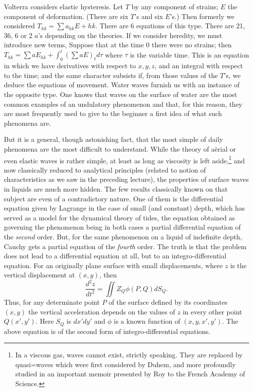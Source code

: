 \documentclass[12pt,oneside]{book}
\newcommand{\iit}[1]{\textit{#1}}
\begin{document}
Volterra considers elastic hysteresis. Let $T$ by any component of strains; $E$
the component of deformation. (There are six $T$'s and six $E$'s.) Then formerly
we considered $T_{hk}=\sum a_{hk}E+{hk}$. There are 6 equations of this type.
There are 21, 36, 6 or 2 $a$'s depending on the theories. If we consider
heredity, we must introduce new terms, Suppose that at the time 0 there were no
strains; then $T_{hk}=\sum aE_{hk}+\int_0^t(\sum aE)_td\tau$ where $\tau$ is the
variable time. This is an equation in which we have derivatives with respect to
$x,y,z$, and an integral with respect to the time; and the same character
subsists if, from those values of the $T$'s, we deduce the equations of
movement. Water waves furnish us with an instance of the opposite type. One
knows that waves on the surface of water are the most common examples of an
undulatory phenomenon and that, for this reason, they are most frequently used
to give to the beginner a first idea of what such phenomena are. \par

But it is a general, though astonishing fact, that the most simple of daily
phenomena are the most difficult to understand. While the theory of a\"erial or
even elastic waves is rather simple, at least as long as viscosity is left
aside,\footnote{In a viscous gas, waves cannot exist, strictly speaking. They
are replaced by quasi=waves which were first considered by Duhem, and more
profoundly studied in an important memoir presented by Roy to the French Academy
of Science.} and now classically reduced to analytical principles (related to
notion of characteristics as we saw in the preceding lecture), the properties of
surface waves in liquids are much more hidden. The few results classically known
on that subject are even of a contradictory nature. One of them is the
differential equation given by Lagrange in the case of small (and constant)
depth, which has served as a model for the dynamical theory of tides, the
equation obtained as governing the phenomenon being in both cases a partial
differential equation of the \iit{second} order. But, for the same phenomenon on
a liquid of indefinite depth, Cauchy gets a partial equation of the \iit{fourth}
order. The truth is that the problem does not lead to a differential equation at
all, but to an integro-differential equation. For an originally plane surface
with small displacements, where $z$ is the vertical displacement at $(x,y)$,
then \begin{equation*} \frac{d^2z}{dt^2}=\iint Z_Q\phi(P,Q)dS_Q.
\end{equation*} Thus, for any determinate point $P$ of the surface defined by
its coordinates $(x,y)$ the vertical acceleration depends on the values of $z$
in every other point $Q(x',y')$. Here $S_Q$ is $dx'dy'$ and $\phi$ is a known
function of $(x,y,x',y')$. The above equation is of the second form of
integro-differential equations. \par
\end{document}
